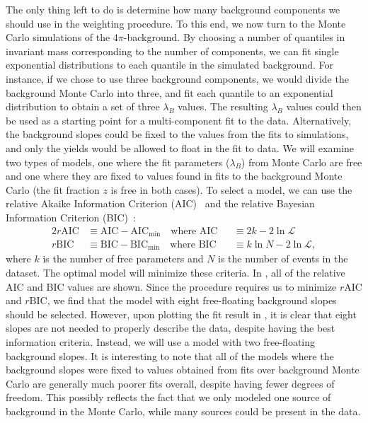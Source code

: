 The only thing left to do is determine how many background components we should use in the weighting procedure. To this end, we now turn to the Monte Carlo simulations of the $4\pi$-background. By choosing a number of quantiles in invariant mass corresponding to the number of components, we can fit single exponential distributions to each quantile in the simulated background. For instance, if we chose to use three background components, we would divide the background Monte Carlo into three, and fit each quantile to an exponential distribution to obtain a set of three $\lambda_B$ values. The resulting  $\lambda_B$ values could then be used as a starting point for a multi-component fit to the data. Alternatively, the background slopes could be fixed to the values from the fits to simulations, and only the yields would be allowed to float in the fit to data. We will examine two types of models, one where the fit parameters ($\lambda_B$) from Monte Carlo are free and one where they are fixed to values found in fits to the background Monte Carlo (the fit fraction $z$ is free in both cases). To select a model, we can use the relative Akaike Information Criterion (AIC)~\cite{Akaike1998} and the relative Bayesian Information Criterion (BIC)~\cite{Schwarz1978}:
\begin{alignat}{2}
  r\text{AIC} &\equiv \text{AIC} - \text{AIC}_\text{min} \quad\text{where } \text{AIC} &&\equiv 2k - 2\ln\mathcal{L} \\
  r\text{BIC} &\equiv \text{BIC} - \text{BIC}_\text{min} \quad\text{where } \text{BIC} &&\equiv k\ln{N} - 2\ln\mathcal{L},
  \label{eq:information-criteria}
\end{alignat}
where $k$ is the number of free parameters and $N$ is the number of events in the dataset. The optimal model will minimize these criteria. In , all of the relative AIC and BIC values are shown. Since the procedure requires us to minimize $r\text{AIC}$ and $r\text{BIC}$, we find that the model with eight free-floating background slopes should be selected. However, upon plotting the fit result in , it is clear that eight slopes are not needed to properly describe the data, despite having the best information criteria. Instead, we will use a model with two free-floating background slopes. It is interesting to note that all of the models where the background slopes were fixed to values obtained from fits over background Monte Carlo are generally much poorer fits overall, despite having fewer degrees of freedom. This possibly reflects the fact that we only modeled one source of background in the Monte Carlo, while many sources could be present in the data.

